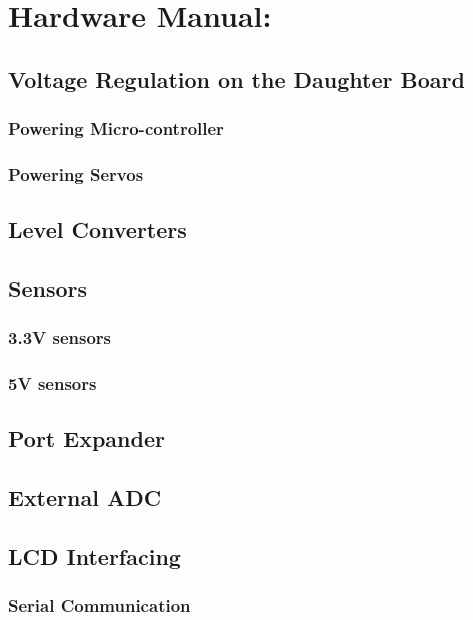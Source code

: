 \documentclass[a4paper,10pt,oneside]{article}
\begin{document}
{		\subsection{}%
	\section{\Huge\textbf{Hardware Manual:}}
	\subsection{\huge Voltage Regulation on the Daughter Board}
		\subsubsection{\Large Powering Micro-controller}
		\subsubsection{\Large Powering Servos}
	\subsection{\huge Level Converters}
	\subsection{\huge Sensors} %
		\subsubsection{\Large 3.3V sensors}
		\subsubsection{\Large 5V sensors}
	\subsection{\huge Port Expander}
	\subsection{\huge External ADC}
	\subsection{\huge LCD Interfacing}
	\subsubsection{\huge Serial Communication}
}
\end{document}

